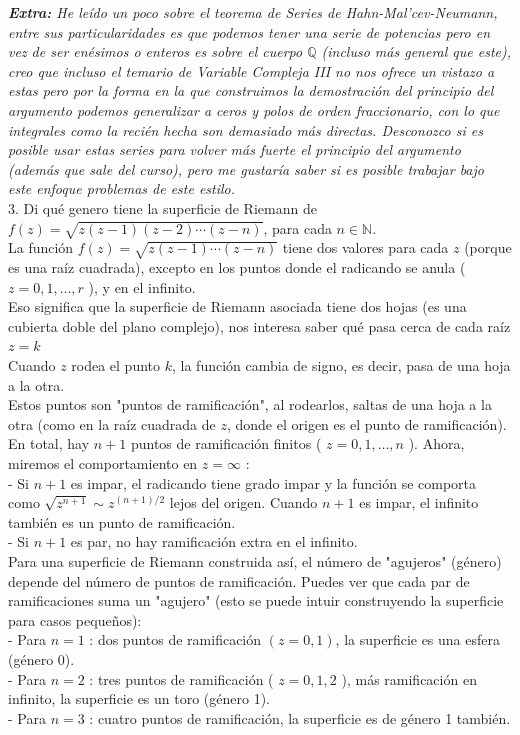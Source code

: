 \documentclass{article}
\theoremstyle{nonumberplain}
\begin{document}
\textit{\textbf{Extra:} He leído un poco sobre el teorema de Series de Hahn-Mal'cev-Neumann, entre sus particularidades es que podemos tener una serie de potencias pero en vez de ser enésimos o enteros es sobre el cuerpo $\mathbb{Q}$ (incluso más general que este), creo que incluso el temario de Variable Compleja III no nos ofrece un vistazo a estas pero por la forma en la que construimos la demostración del principio del argumento podemos generalizar a ceros y polos de orden fraccionario, con lo que integrales como la recién hecha son demasiado más directas. Desconozco si es posible usar estas series para volver más fuerte el principio del argumento (además que sale del curso), pero me gustaría saber si es posible trabajar bajo este enfoque problemas de este estilo.}\\

3. Di qué genero tiene la superficie de Riemann de \( f(z)=\sqrt{z(z-1)(z-2) \cdots(z-n)} \), para cada \( n \in \mathbb{N} \).\\
La función \( f(z)=\sqrt{z(z-1) \cdots(z-n)} \) tiene dos valores para cada \( z \) (porque es una raíz cuadrada), excepto en los puntos donde el radicando se anula ( \( z=0,1, \ldots, r \) ), y en el infinito.\\
Eso significa que la superficie de Riemann asociada tiene dos hojas (es una cubierta doble del plano complejo), nos interesa saber qué pasa cerca de cada raíz \( z=k \) \\
Cuando \( z \) rodea el punto \( k \), la función cambia de signo, es decir, pasa de una hoja a la otra. \\
Estos puntos son "puntos de ramificación", al rodearlos, saltas de una hoja a la otra (como en la raíz cuadrada de \( z \), donde el origen es el punto de ramificación). \\
En total, hay \( n+1 \) puntos de ramificación finitos ( \( z=0,1, \ldots, n \) ). Ahora, miremos el comportamiento en \( z=\infty \) : \\
- Si \( n+1 \) es impar, el radicando tiene grado impar y la función se comporta como \( \sqrt{z^{n+1}} \sim z^{(n+1) / 2} \) lejos del origen. Cuando \( n+1 \) es impar, el infinito también es un punto de ramificación. \\
- Si \( n+1 \) es par, no hay ramificación extra en el infinito.\\
Para una superficie de Riemann construida así, el número de "agujeros" (género) depende del número de puntos de ramificación. Puedes ver que cada par de ramificaciones suma un "agujero" (esto se puede intuir construyendo la superficie para casos pequeños): \\
- Para \( n=1 \) : dos puntos de ramificación \( (z=0,1) \), la superficie es una esfera (género 0). \\
- Para \( n=2 \) : tres puntos de ramificación ( \( z=0,1,2 \) ), más ramificación en infinito, la superficie es un toro (género 1). \\
- Para \( n=3 \) : cuatro puntos de ramificación, la superficie es de género 1 también. \\
\end{document}

